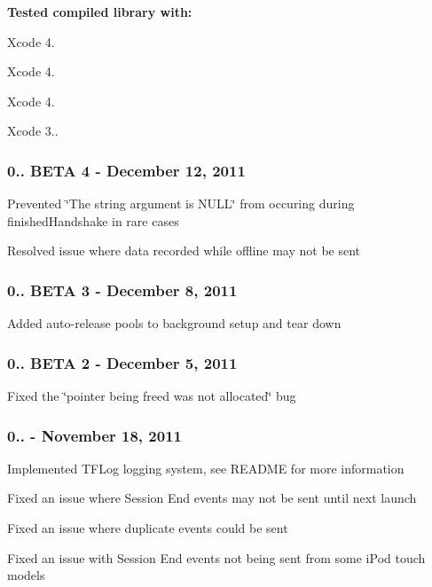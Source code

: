 {\bfseries Tested compiled library with\-:}


\begin{DoxyItemize}
\item Xcode 4.
\item Xcode 4.
\item Xcode 4.
\item Xcode 3..
\end{DoxyItemize}

\subsubsection*{0.. B\-E\-T\-A 4 -\/ December 12, 2011}


\begin{DoxyItemize}
\item Prevented \char`\"{}\-The string argument is N\-U\-L\-L\char`\"{} from occuring during finished\-Handshake in rare cases
\item Resolved issue where data recorded while offline may not be sent
\end{DoxyItemize}

\subsubsection*{0.. B\-E\-T\-A 3 -\/ December 8, 2011}


\begin{DoxyItemize}
\item Added auto-\/release pools to background setup and tear down
\end{DoxyItemize}

\subsubsection*{0.. B\-E\-T\-A 2 -\/ December 5, 2011}


\begin{DoxyItemize}
\item Fixed the \char`\"{}pointer being freed was not allocated\char`\"{} bug
\end{DoxyItemize}

\subsubsection*{0.. -\/ November 18, 2011}


\begin{DoxyItemize}
\item Implemented T\-F\-Log logging system, see R\-E\-A\-D\-M\-E for more information
\item Fixed an issue where Session End events may not be sent until next launch
\item Fixed an issue where duplicate events could be sent
\item Fixed an issue with Session End events not being sent from some i\-Pod touch models
\end{DoxyItemize}

